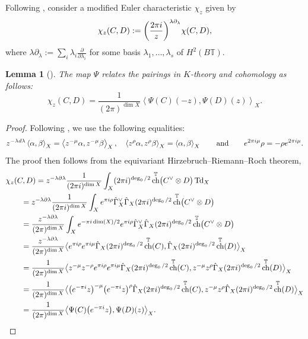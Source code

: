 \documentclass[11pt]{article}
\numberwithin{equation}{section}
\newtheorem{Lemma}[Theorem]{Lemma}
\numberwithin{equation}{section}
\newcommand{\torus}{\mathbb{T}}
\DeclareMathOperator{\ch}{ch}
\newcommand{\br}[1]{\left\langle#1\right\rangle} %
\newcommand{\op}[1]{\operatorname{#1}}
\begin{document}
Following \cite{CIJ}, consider a modified Euler characteristic $\chi_z$ given by
\[
\chi_z(C, D) := \biggl(\frac{2 \pi {\rm i}}{ z}\biggr)^{\lambda \partial_\lambda} \chi(C, D),
\]
where $\lambda \partial_\lambda := \sum_i \lambda_i \frac{\partial}{\partial \lambda_i}$ for some basis $\lambda_1, \dots, \lambda_s$ of $H^2(B\torus)$.


\begin{Lemma}[{\cite[Proposition~2.10]{IriInt}}]
The map $\Psi$ relates the pairings in $K$-theory and cohomology as follows:
\[
\chi_z(C, D) = \frac{1}{ (2 \pi)^{\dim X}}\br{\Psi(C)(-z), \Psi(D)(z)}_X.
\]
\end{Lemma}
\begin{proof}
Following \cite[Proposition~3.2]{CIJ}, we use the following equalities:
\[
 z^{-\lambda {\rm d}\lambda} \br{\alpha,\beta}_X=\br{z^{-\mu}\alpha,z^{-\mu}\beta}_X,\quad \br{z^{\rho}\alpha,z^\rho \beta}_X=\br{\alpha,\beta}_X
 \qquad \text{and}\qquad {\rm e}^{2\pi{\rm i}\mu}\rho=-\rho {\rm e}^{2\pi{\rm i}\mu}.
 \]
The proof then follows from the equivariant Hirzebruch--Riemann--Roch theorem,
\begin{align*}
&\chi_z(C, D)
 = z^{- \lambda \partial \lambda } \frac{1}{(2 \pi {\rm i})^{\dim X}} \int_X (2 \pi {\rm i})^{\op{deg}_0/2} \ch^\torus\bigl(C^\vee \otimes D\bigr) \op{Td}_X \\
&\qquad{} = z^{-\lambda \partial \lambda } \frac{1}{(2 \pi {\rm i})^{\dim X}} \int_X
 {\rm e}^{ \pi {\rm i} \rho} \hat \Gamma_X^\vee \hat \Gamma_X
(2 \pi {\rm i})^{\op{deg}_0/2} \ch^\torus\bigl(C^\vee \otimes D\bigr) \\
&\qquad{} = \frac{z^{-\lambda \partial \lambda }}{ (2 \pi)^{\dim X}} \int_X {\rm e}^{-\pi {\rm i} \dim(X)/2}
 {\rm e}^{\pi {\rm i} \rho} \hat \Gamma_X^\vee \hat \Gamma_X (2 \pi {\rm i})^{\op{deg}_0/2} \ch^\torus\bigl(C^\vee \otimes D\bigr)
 \\
&\qquad{}=
\frac{z^{-\lambda \partial \lambda }}{ (2 \pi)^{\dim X}}\bigl\langle {\rm e}^{\pi {\rm i} \rho} {\rm e}^{\pi {\rm i} \mu} \hat \Gamma_X (2 \pi {\rm i})^{\op{deg}_0/2}\ch^\torus(C), \hat \Gamma_X (2 \pi {\rm i})^{\op{deg}_0/2} \ch^\torus(D)\bigr\rangle_X \\
&\qquad{}=
\frac{1 }{ (2 \pi)^{\dim X}}\bigl\langle z^{- \mu} z^{- \rho} {\rm e}^{\pi {\rm i} \rho} {\rm e}^{\pi {\rm i} \mu} \hat \Gamma_X (2 \pi {\rm i})^{\op{deg}_0/2}\ch^\torus(C), z^{- \mu} z^{\rho} \hat \Gamma_X (2 \pi {\rm i})^{\op{deg}_0/2} \ch^\torus(D)\bigr\rangle_X \\
&\qquad{}=
\frac{1}{ (2 \pi)^{\dim X}}\bigl\langle\bigl( {\rm e}^{-\pi {\rm i}} z\bigr)^{- \mu} \bigl( {\rm e}^{-\pi {\rm i}}z\bigr)^\rho \hat \Gamma_X (2 \pi {\rm i})^{\op{deg}_0/2}\ch^\torus(C), z^{- \mu} z^{\rho} \hat \Gamma_X (2 \pi {\rm i})^{\op{deg}_0/2} \ch^\torus(D)\bigr\rangle_X \\
&\qquad{}= \frac{1}{ (2 \pi)^{\dim X}}\bigl\langle\Psi(C)\bigl( {\rm e}^{-\pi {\rm i}} z\bigr), \Psi(D)(z)\bigr\rangle_X.
\tag*{\qed}
\end{align*}
\renewcommand{\qed}{}
\end{proof}
\end{document}

